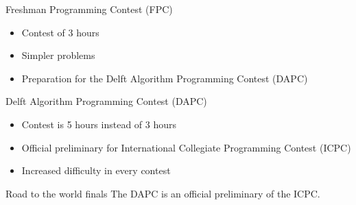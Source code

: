 \documentclass[11pt,pdf, aspectratio=169]{beamer}
\begin{document}
  \begin{frame}{Freshman Programming Contest (FPC)}
    \begin{itemize}
      \item Contest of 3 hours
      \item Simpler problems
      \item Preparation for the Delft Algorithm Programming Contest (DAPC)
    \end{itemize}
  \end{frame}
  \begin{frame}{Delft Algorithm Programming Contest (DAPC)}
    \begin{itemize}
      \item Contest is 5 hours instead of 3 hours
      \item Official preliminary for International Collegiate Programming Contest (ICPC)
      \item Increased difficulty in every contest
    \end{itemize}
  \end{frame}
  \begin{frame}{Road to the world finals}
    The DAPC is an official preliminary of the ICPC.
    
  \end{frame}
\end{document}
